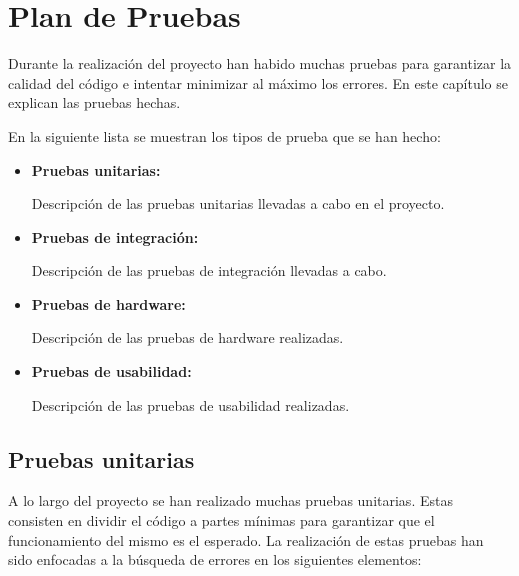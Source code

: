 \section{Plan de Pruebas}

	Durante la realización del proyecto han habido muchas pruebas para garantizar la calidad del código e intentar minimizar al máximo los errores. En este capítulo se explican las pruebas hechas.

	En la siguiente lista se muestran los tipos de prueba que se han hecho:

	\begin{itemize}
		\item \textbf{Pruebas unitarias:}
			
		Descripción de las pruebas unitarias llevadas a cabo en el proyecto.

		\item \textbf{Pruebas de integración:}
			
		Descripción de las pruebas de integración llevadas a cabo.

		\item \textbf{Pruebas de hardware:}
			
		Descripción de las pruebas de hardware realizadas.

		\item \textbf{Pruebas de usabilidad:}
			
		Descripción de las pruebas de usabilidad realizadas.
	\end{itemize}

	\subsection{Pruebas unitarias}

		A lo largo del proyecto se han realizado muchas pruebas unitarias. Estas consisten en dividir el código a partes mínimas para garantizar que el funcionamiento del mismo es el esperado. La realización de estas pruebas han sido enfocadas a la búsqueda de errores en los siguientes elementos:

